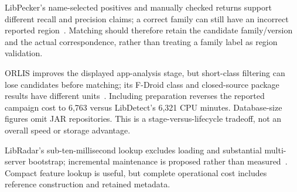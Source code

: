 LibPecker's name-selected positives and manually checked returns support different recall and precision claims; a correct family can still have an incorrect reported region~\cite{tplprecision}. Matching should therefore retain the candidate family/version and the actual correspondence, rather than treating a family label as region validation.

ORLIS improves the displayed app-analysis stage, but short-class filtering can lose candidates before matching; its F-Droid class and closed-source package results have different units~\cite{orlis}. Including preparation reverses the reported campaign cost to 6,763 versus LibDetect's 6,321 CPU minutes. Database-size figures omit JAR repositories. This is a stage-versus-lifecycle tradeoff, not an overall speed or storage advantage.

LibRadar's sub-ten-millisecond lookup excludes loading and substantial multi-server bootstrap; incremental maintenance is proposed rather than measured~\cite{libradar}. Compact feature lookup is useful, but complete operational cost includes reference construction and retained metadata.

